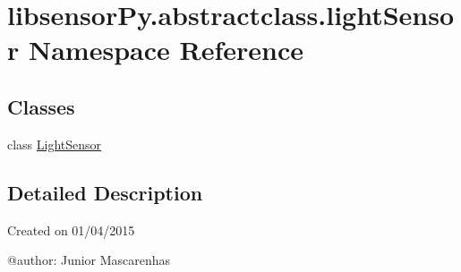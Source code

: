 \hypertarget{namespacelibsensorPy_1_1abstractclass_1_1lightSensor}{}\section{libsensor\+Py.\+abstractclass.\+light\+Sensor Namespace Reference}
\label{namespacelibsensorPy_1_1abstractclass_1_1lightSensor}
\subsection*{Classes}
\begin{DoxyCompactItemize}
\item 
class \hyperlink{classlibsensorPy_1_1abstractclass_1_1lightSensor_1_1LightSensor}{Light\+Sensor}
\end{DoxyCompactItemize}


\subsection{Detailed Description}
\begin{DoxyVerb}Created on 01/04/2015

@author: Junior Mascarenhas
\end{DoxyVerb}
 